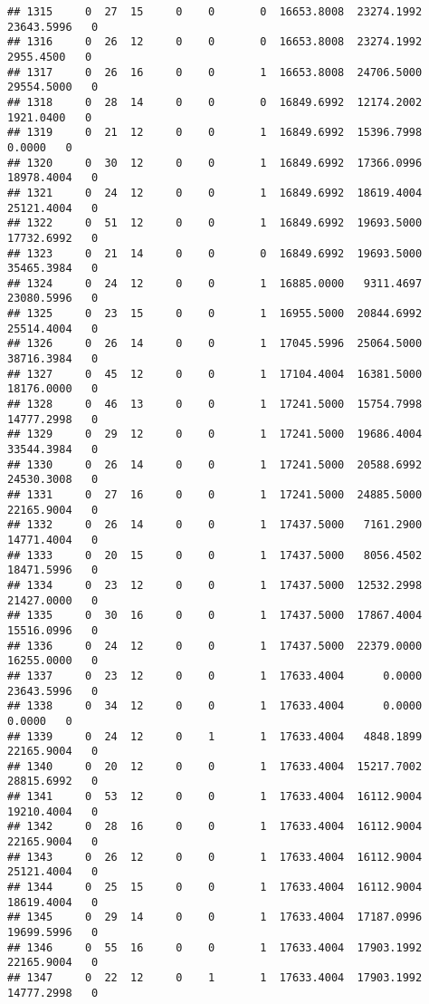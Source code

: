 \documentclass[
]{article}
\begin{document}
\begin{enumerate}
\begin{verbatim}
## 1315     0  27  15     0    0       0  16653.8008  23274.1992  23643.5996   0
## 1316     0  26  12     0    0       0  16653.8008  23274.1992   2955.4500   0
## 1317     0  26  16     0    0       1  16653.8008  24706.5000  29554.5000   0
## 1318     0  28  14     0    0       0  16849.6992  12174.2002   1921.0400   0
## 1319     0  21  12     0    0       1  16849.6992  15396.7998      0.0000   0
## 1320     0  30  12     0    0       1  16849.6992  17366.0996  18978.4004   0
## 1321     0  24  12     0    0       1  16849.6992  18619.4004  25121.4004   0
## 1322     0  51  12     0    0       1  16849.6992  19693.5000  17732.6992   0
## 1323     0  21  14     0    0       0  16849.6992  19693.5000  35465.3984   0
## 1324     0  24  12     0    0       1  16885.0000   9311.4697  23080.5996   0
## 1325     0  23  15     0    0       1  16955.5000  20844.6992  25514.4004   0
## 1326     0  26  14     0    0       1  17045.5996  25064.5000  38716.3984   0
## 1327     0  45  12     0    0       1  17104.4004  16381.5000  18176.0000   0
## 1328     0  46  13     0    0       1  17241.5000  15754.7998  14777.2998   0
## 1329     0  29  12     0    0       1  17241.5000  19686.4004  33544.3984   0
## 1330     0  26  14     0    0       1  17241.5000  20588.6992  24530.3008   0
## 1331     0  27  16     0    0       1  17241.5000  24885.5000  22165.9004   0
## 1332     0  26  14     0    0       1  17437.5000   7161.2900  14771.4004   0
## 1333     0  20  15     0    0       1  17437.5000   8056.4502  18471.5996   0
## 1334     0  23  12     0    0       1  17437.5000  12532.2998  21427.0000   0
## 1335     0  30  16     0    0       1  17437.5000  17867.4004  15516.0996   0
## 1336     0  24  12     0    0       1  17437.5000  22379.0000  16255.0000   0
## 1337     0  23  12     0    0       1  17633.4004      0.0000  23643.5996   0
## 1338     0  34  12     0    0       1  17633.4004      0.0000      0.0000   0
## 1339     0  24  12     0    1       1  17633.4004   4848.1899  22165.9004   0
## 1340     0  20  12     0    0       1  17633.4004  15217.7002  28815.6992   0
## 1341     0  53  12     0    0       1  17633.4004  16112.9004  19210.4004   0
## 1342     0  28  16     0    0       1  17633.4004  16112.9004  22165.9004   0
## 1343     0  26  12     0    0       1  17633.4004  16112.9004  25121.4004   0
## 1344     0  25  15     0    0       1  17633.4004  16112.9004  18619.4004   0
## 1345     0  29  14     0    0       1  17633.4004  17187.0996  19699.5996   0
## 1346     0  55  16     0    0       1  17633.4004  17903.1992  22165.9004   0
## 1347     0  22  12     0    1       1  17633.4004  17903.1992  14777.2998   0

\end{verbatim}
\end{enumerate}
\end{document}
